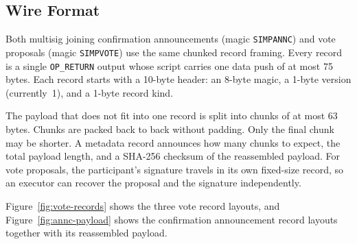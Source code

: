 \documentclass[11pt]{article}
\begin{document}
    \subsection{Wire Format}
    \label{sec:wire}

    Both multisig joining confirmation announcements (magic \texttt{SIMPANNC}) and vote proposals (magic \texttt{SIMPVOTE}) use the same chunked record framing. Every record is a single \texttt{OP\_RETURN} output whose script carries one data push of at most 75 bytes. Each record starts with a 10-byte header: an 8-byte magic, a 1-byte version (currently~1), and a 1-byte record kind.

    The payload that does not fit into one record is split into chunks of at most 63 bytes. Chunks are packed back to back without padding. Only the final chunk may be shorter. A metadata record announces how many chunks to expect, the total payload length, and a SHA-256 checksum of the reassembled payload. For vote proposals, the participant's signature travels in its own fixed-size record, so an executor can recover the proposal and the signature independently.

    Figure~\ref{fig:vote-records} shows the three vote record layouts, and Figure~\ref{fig:annc-payload} shows the confirmation announcement record layouts together with its reassembled payload.
\end{document}
